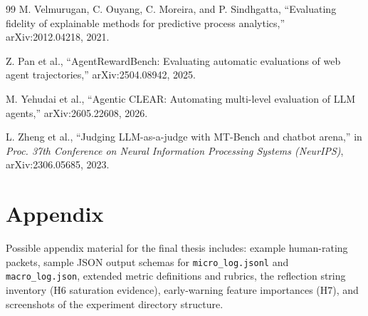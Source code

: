 \documentclass[11pt]{article}
\begin{document}
\begin{thebibliography}{99}
M. Velmurugan, C. Ouyang, C. Moreira, and P. Sindhgatta, ``Evaluating fidelity of explainable methods for predictive process analytics,'' arXiv:2012.04218, 2021.

Z. Pan et al., ``AgentRewardBench: Evaluating automatic evaluations of web agent trajectories,'' arXiv:2504.08942, 2025.

M. Yehudai et al., ``Agentic CLEAR: Automating multi-level evaluation of LLM agents,'' arXiv:2605.22608, 2026.

L. Zheng et al., ``Judging LLM-as-a-judge with MT-Bench and chatbot arena,'' in \emph{Proc. 37th Conference on Neural Information Processing Systems (NeurIPS)}, arXiv:2306.05685, 2023.

\end{thebibliography}

\section*{Appendix}
Possible appendix material for the final thesis includes: example human-rating packets, sample JSON output schemas for \texttt{micro\_log.jsonl} and \texttt{macro\_log.json}, extended metric definitions and rubrics, the reflection string inventory (H6 saturation evidence), early-warning feature importances (H7), and screenshots of the experiment directory structure.
\end{document}
